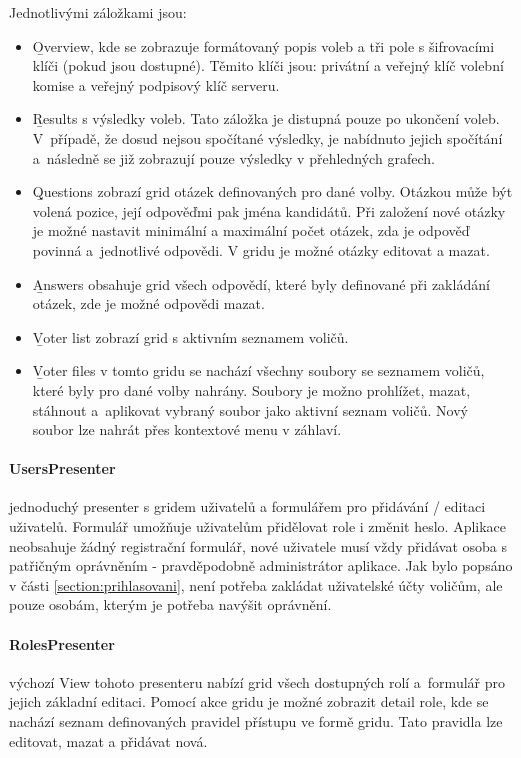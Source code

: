Jednotlivými záložkami jsou:
\begin{itemize}
	\item \b{Overview}, kde se zobrazuje formátovaný popis voleb a tři pole s šifrovacími klíči (pokud jsou dostupné). Těmito klíči jsou: privátní a veřejný klíč volební komise a veřejný podpisový klíč serveru.
	\item \b{Results} s výsledky voleb. Tato záložka je distupná pouze po ukončení voleb. V~případě, že dosud nejsou spočítané výsledky, je nabídnuto jejich spočítání a~následně se již zobrazují pouze výsledky v přehledných grafech.
	\item \b{Questions} zobrazí grid otázek definovaných pro dané volby. Otázkou může být volená pozice, její odpověďmi pak jména kandidátů. Při založení nové otázky je možné nastavit minimální a maximální počet otázek, zda je odpověď povinná a~jednotlivé odpovědi. V gridu je možné otázky editovat a mazat.
	
	\item \b{Answers} obsahuje grid všech odpovědí, které byly definované při zakládání otázek, zde je možné odpovědi mazat.
	
	\item \b{Voter list} zobrazí grid s aktivním seznamem voličů.
	
	\item \b{Voter files} v tomto gridu se nachází všechny soubory se seznamem voličů, které byly pro dané volby nahrány. Soubory je možno prohlížet, mazat, stáhnout a~aplikovat vybraný soubor jako aktivní seznam voličů. Nový soubor lze nahrát přes kontextové menu v záhlaví.
	
\end{itemize}

\paragraph{UsersPresenter} jednoduchý presenter s gridem uživatelů a formulářem pro přidávání / editaci uživatelů. Formulář umožňuje uživatelům přidělovat role i změnit heslo. Aplikace neobsahuje žádný registrační formulář, nové uživatele musí vždy přidávat osoba s patřičným oprávněním - pravděpodobně administrátor aplikace. Jak bylo popsáno v části \ref{section:prihlasovani}, není potřeba zakládat uživatelské účty voličům, ale pouze osobám, kterým je potřeba navýšit oprávnění.

\paragraph{RolesPresenter} výchozí View tohoto presenteru nabízí grid všech dostupných rolí a~formulář pro jejich základní editaci. Pomocí akce gridu je možné zobrazit detail role, kde se nachází seznam definovaných pravidel přístupu ve formě gridu. Tato pravidla lze editovat, mazat a přidávat nová.

